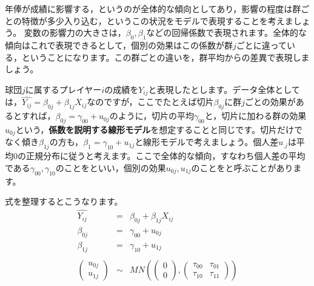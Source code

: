 \documentclass{ltjsbook}
\begin{document}
年俸が成績に影響する，というのが全体的な傾向としてあり，影響の程度は群ごとの特徴が多少入り込む，というこの状況をモデルで表現することを考えましょう。
変数の影響力の大きさは，$\beta_0,\beta_1$などの回帰係数で表現されます。全体的な傾向はこれで表現できるとして，個別の効果はこの係数が群$j$ごとに違っている，ということになります。この群ごとの違いを，群平均からの差異で表現しましょう。

球団$j$に属するプレイヤー$i$の成績を$Y_{ij}$と表現したとします。データ全体としては，$\hat{Y_{ij}} = \beta_{0j} + \beta_{1j} X_{ij}$なのですが，ここでたとえば切片$\beta_{0j}$に群$j$ごとの効果があるとすれば，$\beta_{0j} = \gamma_{00} + u_{0j}$のように，切片の平均$\gamma_{00}$と，切片に加わる群の効果$u_{0j}$という，\textbf{係数を説明する線形モデル}を想定することと同じです。切片だけでなく傾き$\beta_{1j}$の方も，$\beta_{1} = \gamma_{10} + u_{1j}$と線形モデルで考えましょう。個人差$u_{.j}$は平均$0$の正規分布に従うと考えます。ここで全体的な傾向，すなわち個人差の平均である$\gamma_{00},\gamma_{10}$のことをといい，個別の効果$u_{0j},u_{1j}$のことをと呼ぶことがあります。

式を整理するとこうなります。
\begin{equation}
	\begin{array}{lll}
		\hat{Y_{ij}}                                   & =    & \beta_{0j} + \beta_{1j} X_{ij}                                                                                                    \\
		\beta_{0j}                                     & =    & \gamma_{00} + u_{0j}                                                                                                              \\
		\beta_{1j}                                     & =    & \gamma_{10} + u_{1j}                                                                                                              \\ &&\\
		\begin{pmatrix} u_{0j} \\ u_{1j} \end{pmatrix} & \sim & MN \left( \begin{pmatrix} 0\\0\end{pmatrix},\begin{pmatrix} \tau_{00} & \tau_{01} \\ \tau_{10} & \tau_{11} \end{pmatrix} \right )
	\end{array}
\end{equation}
\end{document}

